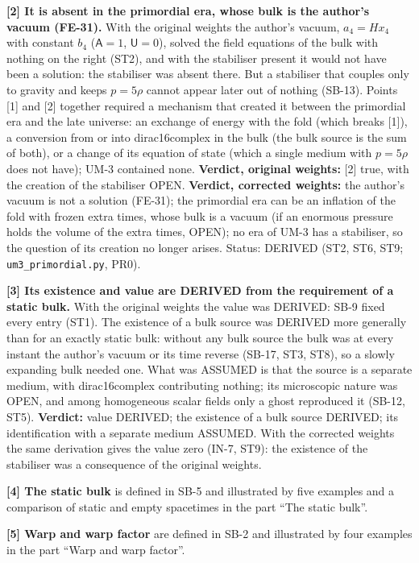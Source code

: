 \documentclass[
  10pt,
]{article}
\begin{document}
\textbf{{[}2{]} It is absent in the primordial era, whose bulk is the
author's vacuum (FE-31).} With the original weights the author's vacuum,
\(a_4 = Hx_4\) with constant \(b_4\) (\(\mathsf{A} = 1\),
\(\mathsf{U} = 0\)), solved the field equations of the bulk with nothing
on the right (ST2), and with the stabiliser present it would not have
been a solution: the stabiliser was absent there. But a stabiliser that
couples only to gravity and keeps \(p = 5\rho\) cannot appear later out
of nothing (SB-13). Points {[}1{]} and {[}2{]} together required a
mechanism that created it between the primordial era and the late
universe: an exchange of energy with the fold (which breaks {[}1{]}), a
conversion from or into dirac16complex in the bulk (the bulk source is
the sum of both), or a change of its equation of state (which a single
medium with \(p = 5\rho\) does not have); UM-3 contained none.
\textbf{Verdict, original weights:} {[}2{]} true, with the creation of
the stabiliser OPEN. \textbf{Verdict, corrected weights:} the author's
vacuum is not a solution (FE-31); the primordial era can be an inflation
of the fold with frozen extra times, whose bulk is a vacuum (if an
enormous pressure holds the volume of the extra times, OPEN); no era of
UM-3 has a stabiliser, so the question of its creation no longer arises.
Status: DERIVED (ST2, ST6, ST9; \texttt{um3\_primordial.py}, PR0).

\textbf{{[}3{]} Its existence and value are DERIVED from the requirement
of a static bulk.} With the original weights the value was DERIVED: SB-9
fixed every entry (ST1). The existence of a bulk source was DERIVED more
generally than for an exactly static bulk: without any bulk source the
bulk was at every instant the author's vacuum or its time reverse
(SB-17, ST3, ST8), so a slowly expanding bulk needed one. What was
ASSUMED is that the source is a separate medium, with dirac16complex
contributing nothing; its microscopic nature was OPEN, and among
homogeneous scalar fields only a ghost reproduced it (SB-12, ST5).
\textbf{Verdict:} value DERIVED; the existence of a bulk source DERIVED;
its identification with a separate medium ASSUMED. With the corrected
weights the same derivation gives the value zero (IN-7, ST9): the
existence of the stabiliser was a consequence of the original weights.

\textbf{{[}4{]} The static bulk} is defined in SB-5 and illustrated by
five examples and a comparison of static and empty spacetimes in the
part ``The static bulk''.

\textbf{{[}5{]} Warp and warp factor} are defined in SB-2 and
illustrated by four examples in the part ``Warp and warp factor''.
\end{document}
